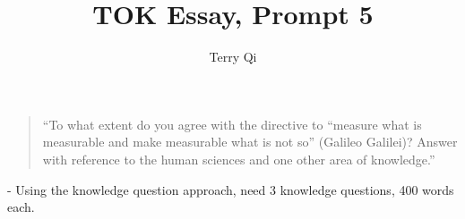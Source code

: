 \documentclass[a4paper,12pt]{article}
\title{\vspace{-8ex}TOK Essay, Prompt 5}
\author{Terry Qi}
\date{}
\begin{document}
\maketitle
\begin{quote}
    ``To what extent do you agree with the directive to ``measure what is measurable and make measurable what is not so'' (Galileo Galilei)? Answer with reference to the human sciences and one other area of knowledge.''
\end{quote}

\vspace{2ex}

- Using the knowledge question approach, need 3 knowledge questions, 400 words each.
\end{document}
